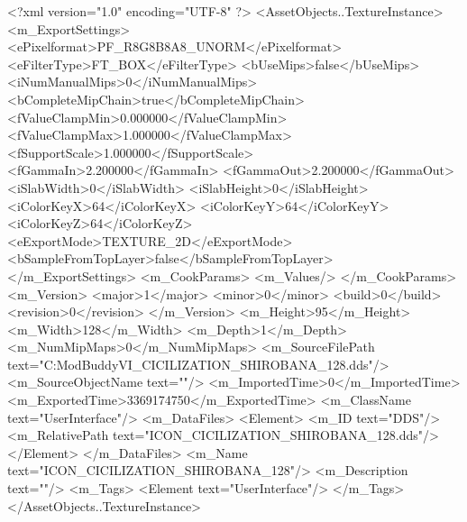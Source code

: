 <?xml version="1.0" encoding="UTF-8" ?>
<AssetObjects..TextureInstance>
	<m_ExportSettings>
		<ePixelformat>PF_R8G8B8A8_UNORM</ePixelformat>
		<eFilterType>FT_BOX</eFilterType>
		<bUseMips>false</bUseMips>
		<iNumManualMips>0</iNumManualMips>
		<bCompleteMipChain>true</bCompleteMipChain>
		<fValueClampMin>0.000000</fValueClampMin>
		<fValueClampMax>1.000000</fValueClampMax>
		<fSupportScale>1.000000</fSupportScale>
		<fGammaIn>2.200000</fGammaIn>
		<fGammaOut>2.200000</fGammaOut>
		<iSlabWidth>0</iSlabWidth>
		<iSlabHeight>0</iSlabHeight>
		<iColorKeyX>64</iColorKeyX>
		<iColorKeyY>64</iColorKeyY>
		<iColorKeyZ>64</iColorKeyZ>
		<eExportMode>TEXTURE_2D</eExportMode>
		<bSampleFromTopLayer>false</bSampleFromTopLayer>
	</m_ExportSettings>
	<m_CookParams>
		<m_Values/>
	</m_CookParams>
	<m_Version>
		<major>1</major>
		<minor>0</minor>
		<build>0</build>
		<revision>0</revision>
	</m_Version>
	<m_Height>95</m_Height>
	<m_Width>128</m_Width>
	<m_Depth>1</m_Depth>
	<m_NumMipMaps>0</m_NumMipMaps>
	<m_SourceFilePath text="C:\Users\asus\Documents\Firaxis ModBuddy\Civilization VI\temppic\ICON_CICILIZATION_SHIROBANA_128.dds"/>
	<m_SourceObjectName text=""/>
	<m_ImportedTime>0</m_ImportedTime>
	<m_ExportedTime>3369174750</m_ExportedTime>
	<m_ClassName text="UserInterface"/>
	<m_DataFiles>
		<Element>
			<m_ID text="DDS"/>
			<m_RelativePath text="ICON_CICILIZATION_SHIROBANA_128.dds"/>
		</Element>
	</m_DataFiles>
	<m_Name text="ICON_CICILIZATION_SHIROBANA_128"/>
	<m_Description text=""/>
	<m_Tags>
		<Element text="UserInterface"/>
	</m_Tags>
</AssetObjects..TextureInstance>

